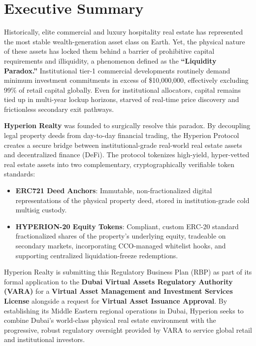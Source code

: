 \documentclass[11pt]{article}
\begin{document}

\newpage
{}
\tableofcontents
\newpage

\setcounter{page}{1}

\section{Executive Summary}
Historically, elite commercial and luxury hospitality real estate has represented the most stable wealth-generation asset class on Earth. Yet, the physical nature of these assets has locked them behind a barrier of prohibitive capital requirements and illiquidity, a phenomenon defined as the \textbf{``Liquidity Paradox.''} Institutional tier-1 commercial developments routinely demand minimum investment commitments in excess of \$10,000,000, effectively excluding 99\% of retail capital globally. Even for institutional allocators, capital remains tied up in multi-year lockup horizons, starved of real-time price discovery and frictionless secondary exit pathways.

\textbf{Hyperion Realty} was founded to surgically resolve this paradox. By decoupling legal property deeds from day-to-day financial trading, the Hyperion Protocol creates a secure bridge between institutional-grade real-world real estate assets and decentralized finance (DeFi). The protocol tokenizes high-yield, hyper-vetted real estate assets into two complementary, cryptographically verifiable token standards:
\begin{itemize}
    \item \textbf{ERC721 Deed Anchors}: Immutable, non-fractionalized digital representations of the physical property deed, stored in institution-grade cold multisig custody.
    \item \textbf{HYPERION-20 Equity Tokens}: Compliant, custom ERC-20 standard fractionalized shares of the property's underlying equity, tradeable on secondary markets, incorporating CCO-managed whitelist hooks, and supporting centralized liquidation-freeze redemptions.
\end{itemize}

Hyperion Realty is submitting this Regulatory Business Plan (RBP) as part of its formal application to the \textbf{Dubai Virtual Assets Regulatory Authority (VARA)} for a \textbf{Virtual Asset Management and Investment Services License} alongside a request for \textbf{Virtual Asset Issuance Approval}. By establishing its Middle Eastern regional operations in Dubai, Hyperion seeks to combine Dubai's world-class physical real estate environment with the progressive, robust regulatory oversight provided by VARA to service global retail and institutional investors.
\end{document}
